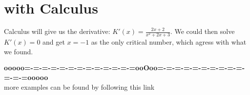 \documentclass{ximera}
\begin{document}
\section{with Calculus}

Calculus will give us the derivative: $K'(x) = \frac{2x+2}{x^2+2x+3}$.  We could then solve $K'(x) = 0$ and get $x=-1$ as the only critical number, which agress with what we found.











\begin{center}
\textbf{\textcolor{green!50!black}{ooooo=-=-=-=-=-=-=-=-=-=-=-=-=ooOoo=-=-=-=-=-=-=-=-=-=-=-=-=ooooo}} \\

more examples can be found by following this link\\ 

\end{center}
\end{document}
